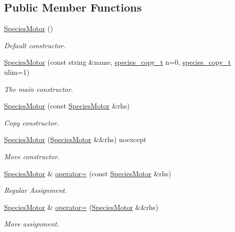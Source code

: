 \subsection*{Public Member Functions}
\begin{DoxyCompactItemize}
\item 
\hyperlink{classSpeciesMotor_ae659b389e46920744b7ba86d0bd8bd86}{Species\+Motor} ()
\begin{DoxyCompactList}\small\item\em Default constructor. \end{DoxyCompactList}\item 
\hyperlink{classSpeciesMotor_a1305517bcaa943a96d145eeab328cc96}{Species\+Motor} (const string \&name, \hyperlink{common_8h_a3503f321fd36304ee274141275cca586}{species\+\_\+copy\+\_\+t} n=0, \hyperlink{common_8h_a3503f321fd36304ee274141275cca586}{species\+\_\+copy\+\_\+t} ulim=1)
\begin{DoxyCompactList}\small\item\em The main constructor. \end{DoxyCompactList}\item 
\hyperlink{classSpeciesMotor_a926ebf2aeb4d3346e3c3ddbd559b23f5}{Species\+Motor} (const \hyperlink{classSpeciesMotor}{Species\+Motor} \&rhs)
\begin{DoxyCompactList}\small\item\em Copy constructor. \end{DoxyCompactList}\item 
\hyperlink{classSpeciesMotor_ae3ea3dc17f8a8772ccbed419c1456f51}{Species\+Motor} (\hyperlink{classSpeciesMotor}{Species\+Motor} \&\&rhs) noexcept
\begin{DoxyCompactList}\small\item\em Move constructor. \end{DoxyCompactList}\item 
\hyperlink{classSpeciesMotor}{Species\+Motor} \& \hyperlink{classSpeciesMotor_a6af8ad1c7062fbe6935b81d72b1b23db}{operator=} (const \hyperlink{classSpeciesMotor}{Species\+Motor} \&rhs)
\begin{DoxyCompactList}\small\item\em Regular Assignment. \end{DoxyCompactList}\item 
\hyperlink{classSpeciesMotor}{Species\+Motor} \& \hyperlink{classSpeciesMotor_ab9ac41b742eefe5d9e514c8baab3c809}{operator=} (\hyperlink{classSpeciesMotor}{Species\+Motor} \&\&rhs)
\begin{DoxyCompactList}\small\item\em Move assignment. \end{DoxyCompactList}\item 

\end{DoxyCompactItemize}
